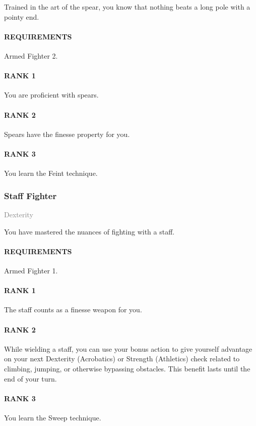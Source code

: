 \normalsize
Trained in the art of the spear, you know that nothing beats a long pole with a pointy end.
\paragraph{REQUIREMENTS} Armed Fighter 2.
\paragraph{RANK 1} You are proficient with spears.
\paragraph{RANK 2} Spears have the finesse property for you.
\paragraph{RANK 3} You learn the Feint technique.

\subsubsection{Staff Fighter} \label{feat::stafffighter}
\small{\textcolor{gray}{Dexterity}}

\normalsize
You have mastered the nuances of fighting with a staff.
\paragraph{REQUIREMENTS} Armed Fighter 1.
\paragraph{RANK 1} The staff counts as a finesse weapon for you.
\paragraph{RANK 2} While wielding a staff, you can use your bonus action to give yourself advantage on your next Dexterity (Acrobatics) or Strength (Athletics) check related to climbing, jumping, or otherwise bypassing obstacles.
This benefit lasts until the end of your turn.
\paragraph{RANK 3} You learn the Sweep technique.

